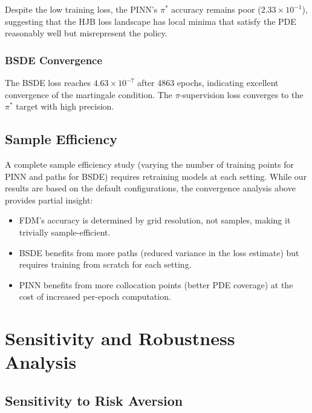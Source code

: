 \documentclass[12pt,a4paper]{article}
\begin{document}
Despite the low training loss, the PINN's $\pi^*$ accuracy remains poor ($2.33 \times 10^{-1}$), suggesting that the HJB loss landscape has local minima that satisfy the PDE reasonably well but misrepresent the policy.

\subsubsection{BSDE Convergence}

The BSDE loss reaches $4.63 \times 10^{-7}$ after 4863 epochs, indicating excellent convergence of the martingale condition. The $\pi$-supervision loss converges to the $\pi^*$ target with high precision.

\subsection{Sample Efficiency}

A complete sample efficiency study (varying the number of training points for PINN and paths for BSDE) requires retraining models at each setting. While our results are based on the default configurations, the convergence analysis above provides partial insight:

\begin{itemize}
    \item FDM's accuracy is determined by grid resolution, not samples, making it trivially sample-efficient.
    \item BSDE benefits from more paths (reduced variance in the loss estimate) but requires training from scratch for each setting.
    \item PINN benefits from more collocation points (better PDE coverage) at the cost of increased per-epoch computation.
\end{itemize}

\section{Sensitivity and Robustness Analysis}
\label{sec:sensitivity}

\subsection{Sensitivity to Risk Aversion}
\end{document}
